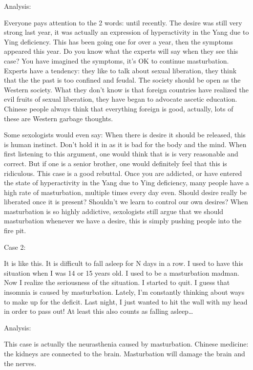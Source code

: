 \documentclass[
]{book}
\begin{document}
Analysis:

Everyone pays attention to the 2 words: until recently. The desire was still very strong last year, it was actually an expression of hyperactivity in the Yang due to Ying deficiency. This has been going one for over a year, then the symptoms appeared this year. Do you know what the experts will say when they see this case? You have imagined the symptoms, it's OK to continue masturbation. Experts have a tendency: they like to talk about sexual liberation, they think that the the past is too confined and feudal. The society should be open as the Western society. What they don't know is that foreign countries have realized the evil fruits of sexual liberation, they have began to advocate ascetic education. Chinese people always think that everything foreign is good, actually, lots of these are Western garbage thoughts.

Some sexologists would even say: When there is desire it should be released, this is human instinct. Don't hold it in as it is bad for the body and the mind. When first listening to this argument, one would think that is is very reasonable and correct. But if one is a senior brother, one would definitely feel that this is ridiculous. This case is a good rebuttal. Once you are addicted, or have entered the state of hyperactivity in the Yang due to Ying deficiency, many people have a high rate of masturbation, multiple times every day even. Should desire really be liberated once it is present? Shouldn't we learn to control our own desires? When masturbation is so highly addictive, sexologists still argue that we should masturbation whenever we have a desire, this is simply pushing people into the fire pit.

Case 2:

It is like this. It is difficult to fall asleep for N days in a row. I used to have this situation when I was 14 or 15 years old. I used to be a masturbation madman. Now I realize the seriousness of the situation. I started to quit. I guess that insomnia is caused by masturbation. Lately, I'm constantly thinking about ways to make up for the deficit. Last night, I just wanted to hit the wall with my head in order to pass out! At least this also counts as falling asleep\ldots{}

Analysis:

This case is actually the neurasthenia caused by masturbation. Chinese medicine: the kidneys are connected to the brain. Masturbation will damage the brain and the nerves.
\end{document}
